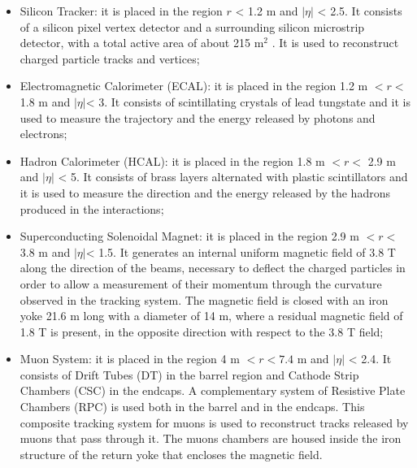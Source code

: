 \begin{itemize}
\item Silicon Tracker: it is placed in the region $r$ < 1.2 m and $|\eta|$ < 2.5. It consists of
a silicon pixel vertex detector and a surrounding silicon microstrip detector, with a
total active area of about 215 m$^2$ . It is used to reconstruct charged particle tracks
and vertices;
\item Electromagnetic Calorimeter (ECAL): it is placed in the region 1.2 m $< r <$
1.8 m and $|\eta|$< 3. It consists of scintillating crystals of lead tungstate  and it is used to measure the trajectory and the energy released by photons and
electrons;
\item Hadron Calorimeter (HCAL): it is placed in the region 1.8 m $< r <$ 2.9 m and
$|\eta|$ < 5. It consists of brass layers alternated with plastic scintillators and it is used
to measure the direction and the energy released by the hadrons produced in the
interactions;
\item Superconducting Solenoidal Magnet: it is placed in the region 2.9 m $< r <$
3.8 m and  $|\eta|$< 1.5. It generates an internal uniform magnetic field of 3.8 T along
the direction of the beams, necessary to deflect the charged particles in order to
allow a measurement of their momentum through the curvature observed in the
tracking system. The magnetic field is closed with an iron yoke 21.6 m long with a
diameter of 14 m, where a residual magnetic field of 1.8 T is present, in the opposite
direction with respect to the 3.8 T field;
\item Muon System: it is placed in the region 4 m $< r < 7.4$ m and $|\eta|$ < 2.4. It consists
of Drift Tubes (DT) in the barrel region and Cathode Strip Chambers (CSC) in the
endcaps. A complementary system of Resistive Plate Chambers (RPC) is used both
in the barrel and in the endcaps. This composite tracking system for muons is used
to reconstruct tracks released by muons that pass through it. The muons chambers
are housed inside the iron structure of the return yoke that encloses the magnetic
field.
\end{itemize}

